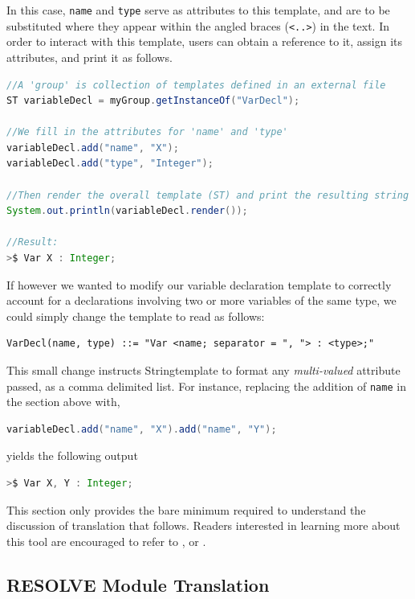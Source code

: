 \documentclass[times]{speauth}
\begin{document}
In this case, \texttt{name} and \texttt{type} serve as attributes to this template, and are to be substituted where they appear within the angled braces (\texttt{<..>}) in the text. In order to interact with this template, users can obtain a reference to it, assign its attributes, and print it as follows.

\begin{lstlisting}[language=java]
//A 'group' is collection of templates defined in an external file
ST variableDecl = myGroup.getInstanceOf("VarDecl"); 

//We fill in the attributes for 'name' and 'type'
variableDecl.add("name", "X");
variableDecl.add("type", "Integer");		     

//Then render the overall template (ST) and print the resulting string
System.out.println(variableDecl.render());

//Result:
>$ Var X : Integer;
\end{lstlisting}

If however we wanted to modify our variable declaration template to correctly account for a declarations involving two or more variables of the same type, we could simply change the template to read as follows:
\begin{lstlisting}
VarDecl(name, type) ::= "Var <name; separator = ", "> : <type>;"
\end{lstlisting}

This small change instructs Stringtemplate to format any \textit{multi-valued} attribute passed, as a comma delimited list. For instance, replacing the addition of \texttt{name} in the section above with,

\begin{lstlisting}[language=java]
variableDecl.add("name", "X").add("name", "Y");
\end{lstlisting}	

yields the following output
\begin{lstlisting}[language=java]
>$ Var X, Y : Integer;
\end{lstlisting}	

This section only provides the bare minimum required to understand the discussion of translation that follows. Readers interested in learning more about this tool are encouraged to refer to \cite{parr:2004}, or \cite{parr:2006}.

\subsection{RESOLVE Module Translation}
\end{document}

